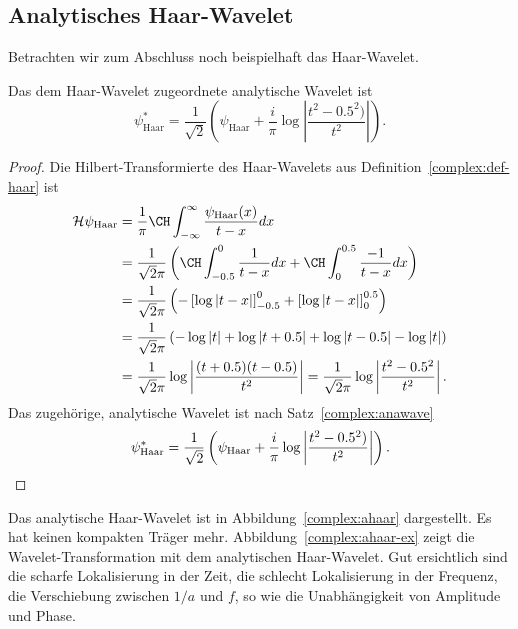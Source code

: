 \subsection{Analytisches Haar-Wavelet}
Betrachten wir zum Abschluss noch beispielhaft das Haar-Wavelet.
\begin{satz}
    Das dem Haar-Wavelet zugeordnete analytische Wavelet ist
    \[\psi^\ast_{\text{Haar}} = \frac{1}{\sqrt{2}}\left(\psi_{\text{Haar}} + \frac{i}{\pi} \log\left|\frac{t^2-0.5^2)}{t^2}\right|\right).\]
\end{satz}

\begin{proof}
    Die Hilbert-Transformierte des Haar-Wavelets aus Definition~\ref{complex:def-haar} ist
    \begin{align*}
    \mathcal{H} \psi_{\text{Haar}}
    &= \frac{1}{\pi} \CH\int_{-\infty}^{\infty} \frac{\psi_{\text{Haar}}(x)}{t-x} dx\\
    &= \frac{1}{\sqrt2\pi}\left( \CH\int_{-0.5}^{0} \frac{1}{t-x}dx + \CH\int_{0}^{0.5} \frac{-1}{t-x}dx \right)\\
    &= \frac{1}{\sqrt2\pi} \left( -\left[\log \left|t-x\right| \right]_{-0.5}^{0} + \left[\log\left|t-x\right| \right]_{0}^{0.5} \right)\\
    &= \frac{1}{\sqrt2\pi} \left( -\log\left|t\right| + \log\left|t+0.5\right| + \log\left|t-0.5\right| - \log\left|t\right|\right)\\
    &= \frac{1}{\sqrt2\pi} \log\left|\frac{(t+0.5)(t-0.5)}{t^2}\right|
    = \frac{1}{\sqrt2\pi} \log\left|\frac{t^2-0.5^2}{t^2}\right|.
    \end{align*}
    Das zugehörige, analytische Wavelet ist nach Satz~\eqref{complex:anawave}
    \[
    \psi^\ast_{\text{Haar}} = \frac{1}{\sqrt{2}}\left(\psi_{\text{Haar}} + \frac{i}{\pi} \log\left|\frac{t^2-0.5^2)}{t^2}\right|\right).\qedhere
    \]
\end{proof}

Das analytische Haar-Wavelet ist in Abbildung~\ref{complex:ahaar} dargestellt.
Es hat keinen kompakten Träger mehr.
Abbildung~\ref{complex:ahaar-ex} zeigt die Wavelet-Transformation mit dem analytischen Haar-Wavelet.
Gut ersichtlich sind die scharfe Lokalisierung in der Zeit, die schlecht Lokalisierung in der Frequenz, die Verschiebung zwischen $1/a$ und $f$, so wie die Unabhängigkeit von Amplitude und Phase.

